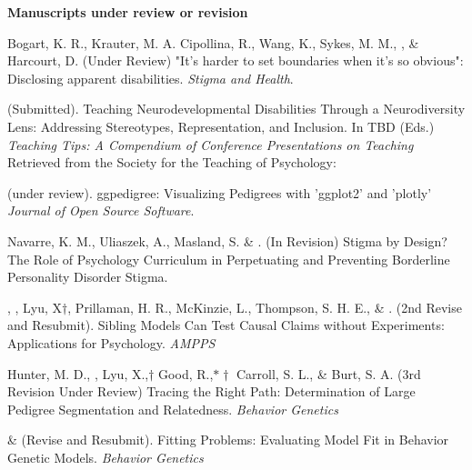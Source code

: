 

{\large \textbf{Manuscripts under review or revision}}
\begin{etaremune}

\item Bogart, K. R., Krauter, M. A. Cipollina, R., Wang, K., Sykes, M. M., \meb, \& Harcourt, D. (Under Review) "It's harder to set boundaries when it's so obvious": Disclosing apparent disabilities. \textit{Stigma and Health}. 

\item \meb (Submitted). Teaching Neurodevelopmental Disabilities Through a Neurodiversity Lens: Addressing Stereotypes, Representation, and Inclusion.  In TBD  (Eds.) \textit{Teaching Tips: A Compendium of Conference Presentations on Teaching} Retrieved from the Society for the Teaching of Psychology: \href{http://teachpsych.org/ebooks/}{\small\color{blue}{teachpsych.org/ebooks/}}
\item \meb  (under review). ggpedigree: Visualizing Pedigrees with 'ggplot2' and 'plotly' \textit{Journal of Open Source Software}. \href{https://joss.theoj.org/papers/e5116b83b03e2740960d1153c45f9480}{\small\color{blue}{submission}}
\item Navarre, K. M.\noteB, Uliaszek, A., Masland, S. \& \meb. (In Revision) Stigma by Design? The Role of Psychology Curriculum in Perpetuating and Preventing Borderline Personality Disorder Stigma. %

\item \meb, \jt, Lyu, X$\dagger$, Prillaman, H. R.\noteA, McKinzie, L.\noteA, Thompson, S. H. E.\noteA, \& \joe. (2nd Revise and Resubmit). Sibling Models Can Test Causal Claims without Experiments: Applications for Psychology. \href{https://www.medrxiv.org/content/10.1101/2025.08.25.25334395v1}{\small\color{blue}{medrxiv.org/content/10.1101/2025.08.25.25334395v1}} \textit{AMPPS} %


\item Hunter, M. D., \meb, Lyu, X.,$\dagger$ Good, R.,$*\dagger$ Carroll, S. L., \& Burt, S. A. (3rd Revision Under Review) Tracing the Right Path: Determination of Large Pedigree Segmentation and Relatedness. \textit{Behavior Genetics}

\item \meb \& \joe (Revise and Resubmit). Fitting Problems: Evaluating Model Fit in Behavior Genetic Models. \textit{Behavior Genetics}  \href{https://doi.org/10.31234/osf.io/qys83}{\small\color{blue}{10.31234/osf.io/qys83}}
\end{etaremune}
